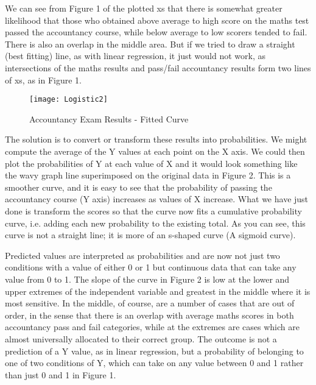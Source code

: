 \documentclass[a4paper,12pt]{article}
\begin{document}
We can see from Figure 1 of the plotted xs that there is somewhat greater likelihood
that those who obtained above average to high score on the maths test passed the accountancy course, while below average to low scorers tended to fail. There is also an overlap in
the middle area. But if we tried to draw a straight (best fitting) line, as with linear regression,
it just would not work, as intersections of the maths results and pass/fail accountancy results
form two lines of xs, as in Figure 1.
%
\begin{center}
\begin{figure}
  \texttt{[image: Logistic2]}\\
  \caption{Accountancy Exam Results - Fitted Curve}
\end{figure}
\end{center}

The solution is to convert or transform these results into probabilities. We might compute
the average of the Y values at each point on the X axis. We could then plot the probabilities
of Y at each value of X and it would look something like the wavy graph line superimposed
on the original data in Figure 2. This is a smoother curve, and it is easy to see that the
probability of passing the accountancy course (Y axis) increases as values of X increase.
What we have just done is transform the scores so that the curve now fits a cumulative
probability curve, i.e. adding each new probability to the existing total. As you can see, this
curve is not a straight line; it is more of an s-shaped curve (A sigmoid curve).

Predicted values are interpreted as probabilities and are now not just two conditions with a value of either 0 or 1 but continuous data that can take any value from 0 to 1.
The slope of the curve in Figure 2 is low at the lower and upper extremes of the
independent variable and greatest in the middle where it is most sensitive. In the middle, of
course, are a number of cases that are out of order, in the sense that there is an overlap with
average maths scores in both accountancy pass and fail categories, while at the extremes are
cases which are almost universally allocated to their correct group. The outcome is not a prediction of a Y value, as in linear regression, but a probability of belonging to one of two conditions
of Y, which can take on any value between 0 and 1 rather than just 0 and 1 in Figure 1.
\end{document}
